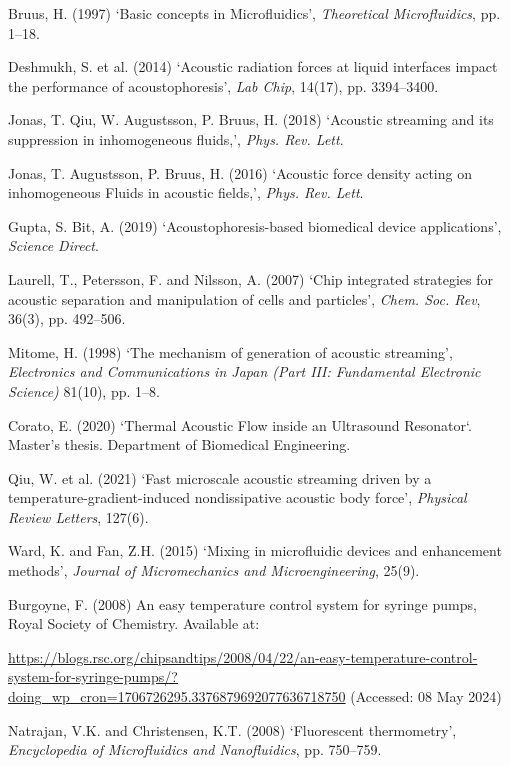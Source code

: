 \documentclass[twoside,twocolumn,9pt,a4paper]{IEEEtran}
\begin{document}
\newpage
\begin{thebibliography}{99} %

 Bruus, H. (1997) ‘Basic concepts in Microfluidics’, \textit{Theoretical Microfluidics}, pp. 1–18.

 Deshmukh, S. et al. (2014) ‘Acoustic radiation forces at liquid interfaces impact the performance of acoustophoresis’, \textit{Lab Chip}, 14(17), pp. 3394–3400. 

 Jonas, T. Qiu, W. Augustsson, P. Bruus, H. (2018) ‘Acoustic streaming and its suppression in inhomogeneous fluids,’, \textit{Phys. Rev. Lett}.

 Jonas, T. Augustsson, P. Bruus, H. (2016) ‘Acoustic force density acting on inhomogeneous Fluids in acoustic fields,’, \textit{Phys. Rev. Lett}.

 Gupta, S. Bit, A. (2019) ‘Acoustophoresis-based biomedical device applications’, \textit{Science Direct}. 

 Laurell, T., Petersson, F. and Nilsson, A. (2007) ‘Chip integrated strategies for acoustic separation and manipulation of cells and particles’, \textit{Chem. Soc. Rev}, 36(3), pp. 492–506.

 Mitome, H. (1998) ‘The mechanism of generation of acoustic streaming’, \textit{Electronics and Communications in Japan (Part III: Fundamental Electronic Science)} 81(10), pp. 1–8.

 Corato, E. (2020) ‘Thermal Acoustic Flow inside an Ultrasound Resonator‘. Master’s thesis. Department of Biomedical Engineering.

 Qiu, W. et al. (2021) ‘Fast microscale acoustic streaming driven by a temperature-gradient-induced nondissipative acoustic body force’, \textit{Physical Review Letters}, 127(6). 


 Ward, K. and Fan, Z.H. (2015) ‘Mixing in microfluidic devices and enhancement methods’, \textit{Journal of Micromechanics and Microengineering}, 25(9). 


 Burgoyne, F. (2008) An easy temperature control system for syringe pumps, Royal Society of Chemistry. Available at: 

\url{https://blogs.rsc.org/chipsandtips/2008/04/22/an-easy-temperature-control-system-for-syringe-pumps/?doing_wp_cron=1706726295.3376879692077636718750} (Accessed: 08 May 2024)

 Natrajan, V.K. and Christensen, K.T. (2008) ‘Fluorescent thermometry’, \textit{Encyclopedia of Microfluidics and Nanofluidics}, pp. 750–759. 


\end{thebibliography}
\end{document}
